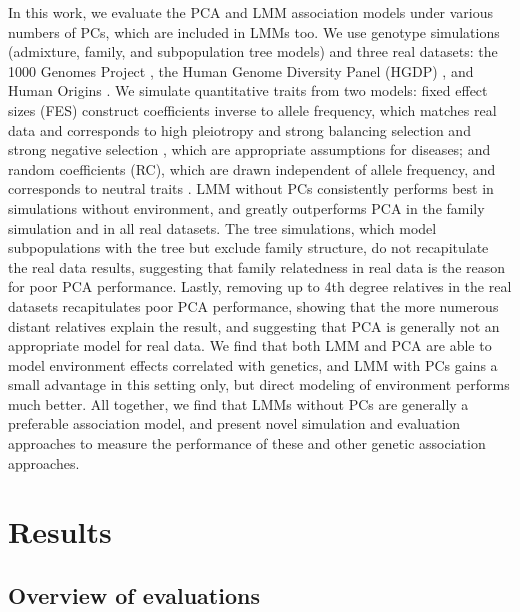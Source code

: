 \documentclass[9pt,lineno]{elife}
\begin{document}
In this work, we evaluate the PCA and LMM association models under various numbers of PCs, which are included in LMMs too.
We use genotype simulations (admixture, family, and subpopulation tree models) and three real datasets: the 1000 Genomes Project \citep{the_1000_genomes_project_consortium_map_2010, 1000_genomes_project_consortium_integrated_2012}, the Human Genome Diversity Panel (HGDP) \citep{cann_human_2002, rosenberg_genetic_2002, bergstrom_insights_2020}, and Human Origins \citep{patterson_ancient_2012, lazaridis_ancient_2014, lazaridis_genomic_2016, skoglund_genomic_2016}.
We simulate quantitative traits from two models: fixed effect sizes (FES) construct coefficients inverse to allele frequency, which matches real data \citep{park_distribution_2011, zeng_signatures_2018, oconnor_extreme_2019} and corresponds to high pleiotropy and strong balancing selection \citep{simons_population_2018} and strong negative selection \citep{zeng_signatures_2018, oconnor_extreme_2019}, which are appropriate assumptions for diseases; and random coefficients (RC), which are drawn independent of allele frequency, and corresponds to neutral traits \citep{zeng_signatures_2018, simons_population_2018}.
LMM without PCs consistently performs best in simulations without environment, and greatly outperforms PCA in the family simulation and in all real datasets.
The tree simulations, which model subpopulations with the tree but exclude family structure, do not recapitulate the real data results, suggesting that family relatedness in real data is the reason for poor PCA performance.
Lastly, removing up to 4th degree relatives in the real datasets recapitulates poor PCA performance, showing that the more numerous distant relatives explain the result, and suggesting that PCA is generally not an appropriate model for real data.
We find that both LMM and PCA are able to model environment effects correlated with genetics, and LMM with PCs gains a small advantage in this setting only, but direct modeling of environment performs much better.
All together, we find that LMMs without PCs are generally a preferable association model, and present novel simulation and evaluation approaches to measure the performance of these and other genetic association approaches.

\section{Results}

\subsection{Overview of evaluations}
\end{document}
